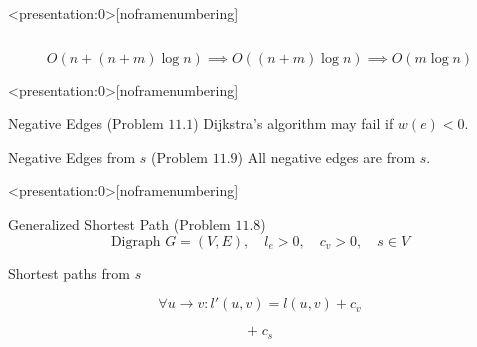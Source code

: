 
\begin{frame}<presentation:0>[noframenumbering]
  \centerline{}
\end{frame}

\begin{frame}{}
  \begin{columns}
	  
  \end{columns}

  \pause
  \vspace{0.60cm}
  \[
    O(n + (n+m) \log n) \implies O((n + m) \log n) \implies O(m \log n)
  \]
\end{frame}

\begin{frame}
  \begin{center}
	\resizebox{0.80\textwidth}{!}{}
  \end{center}
\end{frame}

\begin{frame}<presentation:0>[noframenumbering]
  \begin{exampleblock}{Negative Edges (Problem $11.1$)}
    Dijkstra's algorithm may fail if $w(e) < 0$.
  \end{exampleblock}

\end{frame}

\begin{frame}
  \begin{exampleblock}{Negative Edges from $s$ (Problem $11.9$)}
    All negative edges are from $s$.
  \end{exampleblock}

  \pause
\end{frame}
\begin{frame}<presentation:0>[noframenumbering]
  \begin{exampleblock}{Generalized Shortest Path (Problem $11.8$)}
    \[
      \text{Digraph } G = (V, E),\quad l_e > 0,\quad c_v > 0,\quad s \in V
    \]

    \centerline{Shortest paths from $s$}
  \end{exampleblock}

  \pause
  \[
    \forall u \to v: l'(u,v) = l(u,v) + c_v
  \]

  \pause
  \[
    +\; c_s
  \]
\end{frame}
